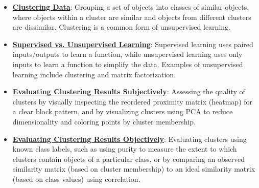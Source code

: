 \documentclass{article}%
\begin{document}
\begin{itemize}[leftmargin=*]
\item \href{https://purdue.brightspace.com/d2l/common/assets/pdfjs-d2l-dist/1.0.14-legacy/web/viewer.html?file=%2Fcontent%2Fenforced%2F1095467-wl.202510.CS.24300.001%2F12L2-distance-clusters.pdf%3Fou%3D1095467&lang=en-us&container=d2l-fileviewer-rendered-pdf&fullscreen=d2l-fileviewer-rendered-pdf-dialog&height=667#page=4}{\textbf{Clustering Data}}: Grouping a set of objects into classes of similar objects, where objects within a cluster are similar and objects from different clusters are dissimilar. Clustering is a common form of unsupervised learning.%
\item \href{https://purdue.brightspace.com/d2l/common/assets/pdfjs-d2l-dist/1.0.14-legacy/web/viewer.html?file=%2Fcontent%2Fenforced%2F1095467-wl.202510.CS.24300.001%2F12L2-distance-clusters.pdf%3Fou%3D1095467&lang=en-us&container=d2l-fileviewer-rendered-pdf&fullscreen=d2l-fileviewer-rendered-pdf-dialog&height=667#page=3}{\textbf{Supervised vs. Unsupervised Learning}}: Supervised learning uses paired inputs/outputs to learn a function, while unsupervised learning uses only inputs to learn a function to simplify the data. Examples of unsupervised learning include clustering and matrix factorization.%
\item \href{https://purdue.brightspace.com/d2l/common/assets/pdfjs-d2l-dist/1.0.14-legacy/web/viewer.html?file=%2Fcontent%2Fenforced%2F1095467-wl.202510.CS.24300.001%2F12L2-distance-clusters.pdf%3Fou%3D1095467&lang=en-us&container=d2l-fileviewer-rendered-pdf&fullscreen=d2l-fileviewer-rendered-pdf-dialog&height=667#page=38}{\textbf{Evaluating Clustering Results Subjectively}}: Assessing the quality of clusters by visually inspecting the reordered proximity matrix (heatmap) for a clear block pattern, and by visualizing clusters using PCA to reduce dimensionality and coloring points by cluster membership.%
\item \href{https://purdue.brightspace.com/d2l/common/assets/pdfjs-d2l-dist/1.0.14-legacy/web/viewer.html?file=%2Fcontent%2Fenforced%2F1095467-wl.202510.CS.24300.001%2F12L2-distance-clusters.pdf%3Fou%3D1095467&lang=en-us&container=d2l-fileviewer-rendered-pdf&fullscreen=d2l-fileviewer-rendered-pdf-dialog&height=667#page=43}{\textbf{Evaluating Clustering Results Objectively}}: Evaluating clusters using known class labels, such as using purity to measure the extent to which clusters contain objects of a particular class, or by comparing an observed similarity matrix (based on cluster membership) to an ideal similarity matrix (based on class values) using correlation.%

\end{itemize}
\end{document}
